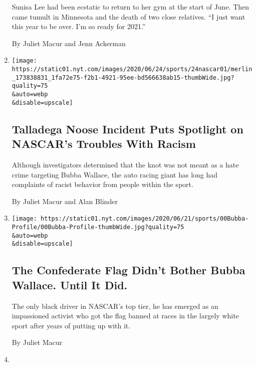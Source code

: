 \begin{enumerate}
  Sunisa Lee had been ecstatic to return to her gym at the start of
  June. Then came tumult in Minnesota and the death of two close
  relatives. ``I just want this year to be over. I'm so ready for
  2021.''

  By Juliet Macur and Jenn Ackerman
\item
  \href{/2020/06/24/sports/autoracing/bubba-wallace-noose-nascar.html}{}

  \texttt{[image: https://static01.nyt.com/images/2020/06/24/sports/24nascar01/merlin\_173838831\_1fa72e75-f2b1-4921-95ee-bd566638ab15-thumbWide.jpg?quality=75\\\&auto=webp\\\&disable=upscale]}

  \hypertarget{talladega-noose-incident-puts-spotlight-on-nascars-troubles-with-racism}{%
  \subsection{Talladega Noose Incident Puts Spotlight on NASCAR's
  Troubles With
  Racism}\label{talladega-noose-incident-puts-spotlight-on-nascars-troubles-with-racism}}

  Although investigators determined that the knot was not meant as a
  hate crime targeting Bubba Wallace, the auto racing giant has long had
  complaints of racist behavior from people within the sport.

  By Juliet Macur and Alan Blinder
\item
  \href{/2020/06/19/sports/autoracing/bubba-wallace-nascar-black-lives-matter-confederate-flag.html}{}

  \texttt{[image: https://static01.nyt.com/images/2020/06/21/sports/00Bubba-Profile/00Bubba-Profile-thumbWide.jpg?quality=75\\\&auto=webp\\\&disable=upscale]}

  \hypertarget{the-confederate-flag-didnt-bother-bubba-wallace-until-it-did}{%
  \subsection{The Confederate Flag Didn't Bother Bubba Wallace. Until It
  Did.}\label{the-confederate-flag-didnt-bother-bubba-wallace-until-it-did}}

  The only black driver in NASCAR's top tier, he has emerged as an
  impassioned activist who got the flag banned at races in the largely
  white sport after years of putting up with it.

  By Juliet Macur
\item
  \href{/2020/06/13/sports/bubba-wallace-nascar-confederate-flag.html}{}


\end{enumerate}
